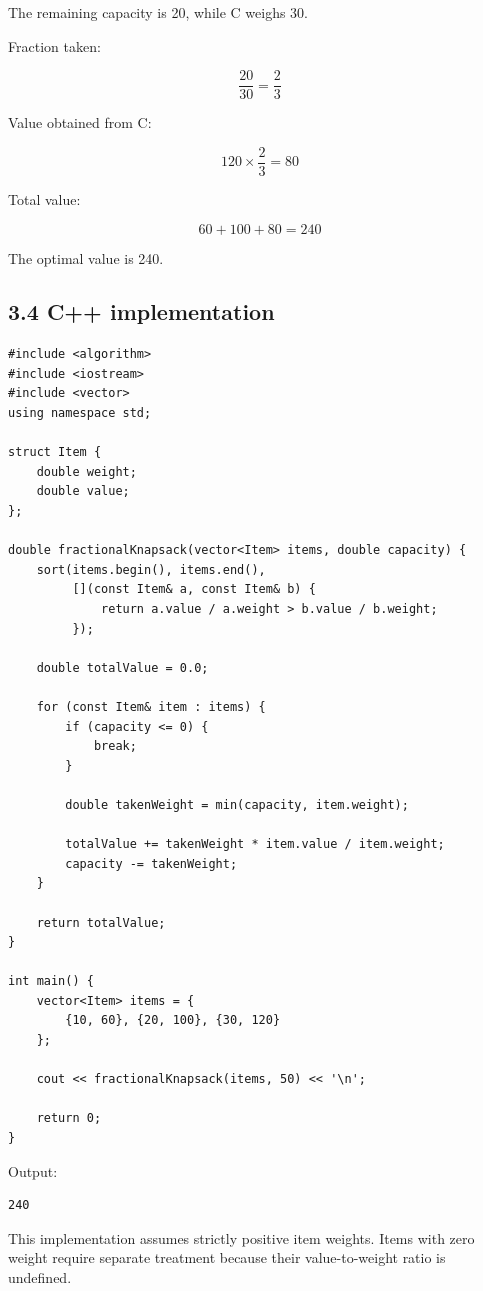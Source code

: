 The remaining capacity is 20, while C weighs 30.

Fraction taken:


\[
\frac{20}{30}=\frac23
\]


Value obtained from C:


\[
120\times\frac23=80
\]


Total value:


\[
60+100+80=\boxed{240}
\]


The optimal value is 240.

\subsection{3.4 C++ implementation}

\begin{lstlisting}[style=cppstyle]
#include <algorithm>
#include <iostream>
#include <vector>
using namespace std;

struct Item {
    double weight;
    double value;
};

double fractionalKnapsack(vector<Item> items, double capacity) {
    sort(items.begin(), items.end(),
         [](const Item& a, const Item& b) {
             return a.value / a.weight > b.value / b.weight;
         });

    double totalValue = 0.0;

    for (const Item& item : items) {
        if (capacity <= 0) {
            break;
        }

        double takenWeight = min(capacity, item.weight);

        totalValue += takenWeight * item.value / item.weight;
        capacity -= takenWeight;
    }

    return totalValue;
}

int main() {
    vector<Item> items = {
        {10, 60}, {20, 100}, {30, 120}
    };

    cout << fractionalKnapsack(items, 50) << '\n';

    return 0;
}
\end{lstlisting}

Output:

\begin{lstlisting}[style=pseudocode]
240
\end{lstlisting}

This implementation assumes strictly positive item weights. Items with zero weight require separate treatment because their value-to-weight ratio is undefined.

